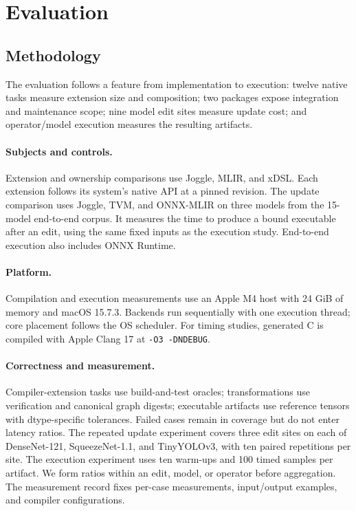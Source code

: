 \section{Evaluation}
\label{sec:evaluation}

\subsection{Methodology}
\label{sec:eval-method}

The evaluation follows a feature from implementation to execution: twelve
native tasks measure extension size and composition; two packages expose
integration and maintenance scope; nine model edit sites measure update cost;
and operator/model execution measures the resulting artifacts.

\paragraph{Subjects and controls.}
Extension and ownership comparisons use Joggle, MLIR, and xDSL. Each extension
follows its system's native API at a pinned revision. The update comparison
uses Joggle, TVM, and ONNX-MLIR on three models from the 15-model end-to-end
corpus. It measures the time to produce a bound executable after an edit,
using the same fixed inputs as the execution study.
End-to-end execution also includes ONNX Runtime.

\paragraph{Platform.}
Compilation and execution measurements use an Apple M4 host with 24 GiB of
memory and macOS 15.7.3. Backends run sequentially with one execution thread;
core placement follows the OS scheduler. For timing studies, generated C is
compiled with Apple Clang 17 at \texttt{-O3 -DNDEBUG}.

\paragraph{Correctness and measurement.}
Compiler-extension tasks use build-and-test oracles; transformations use
verification and canonical graph digests; executable artifacts use reference
tensors with dtype-specific tolerances. Failed cases remain in coverage but do
not enter latency ratios. The repeated update experiment covers three edit sites on each of
DenseNet-121, SqueezeNet-1.1, and TinyYOLOv3, with ten paired repetitions per site. The
execution experiment uses ten warm-ups and 100 timed samples per artifact. We
form ratios within an edit, model, or operator before aggregation. The measurement
record fixes per-case measurements, input/output examples, and compiler configurations.

